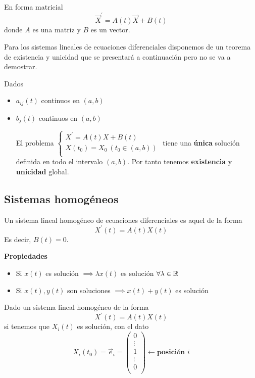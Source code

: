 En forma matricial
$$\vec{X}^\prime = A(t)\vec{X}+B(t)$$ donde $A$ es una matriz y $B$ es un vector.

Para los sistemas lineales de ecuaciones diferenciales disponemos de un teorema de existencia y unicidad que se presentará a continuación pero no se va a demostrar.

\begin{theorem}
Dados
\begin{itemize}
\item $a_{ij}(t)$ continuos en $(a,b)$
\item $b_j(t)$ continuos en $(a,b)$

El problema $
  \left\lbrace
  \begin{array}{l}
     X^\prime = A(t)X+B(t)\\
     X(t_0) = X_0\ (t_0\in(a,b))\\
  \end{array}
  \right.
$
tiene una \textbf{única} solución definida en todo el intervalo $(a,b)$. Por tanto tenemos \textbf{existencia} y \textbf{unicidad} global.
\end{itemize}
\end{theorem}

\subsection{Sistemas homogéneos}
\begin{definition}
Un sistema lineal homogéneo de ecuaciones diferenciales es aquel de la forma $$X^\prime(t) = A(t)X(t)$$ Es decir, $B(t) = 0$.
\end{definition}
\noindent\textbf{Propiedades}
\begin{itemize}
\item Si $x(t)$ es solución $\implies \lambda x(t)$ es solución $\forall \lambda \in \mathbb{R}$
\item Si $x(t), y(t)$ son soluciones $\implies x(t)+y(t)$ es solución
\end{itemize}

\obs

Dado un sistema lineal homogéneo de la forma $$X^\prime(t) = A(t)X(t)$$ si tenemos que $X_i(t)$ es solución, con el dato $$X_i(t_0) = \vec{e}_i = \begin{pmatrix}
0\\
\vdots\\
1\\
\vdots\\
0\\
\end{pmatrix} \leftarrow \textbf{posición } i$$

